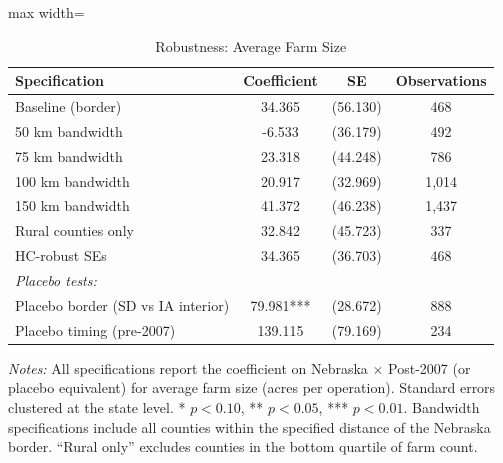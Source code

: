 \begin{table}[H]
\centering
\caption{Robustness: Average Farm Size}
\label{tab:robust}
\begin{threeparttable}
\begin{adjustbox}{max width=\textwidth}
\begin{tabular}{lccc}
\toprule
Specification & Coefficient & SE & Observations \\
\midrule
Baseline (border) & 34.365 & (56.130) & 468 \\
50 km bandwidth & -6.533 & (36.179) & 492 \\
75 km bandwidth & 23.318 & (44.248) & 786 \\
100 km bandwidth & 20.917 & (32.969) & 1,014 \\
150 km bandwidth & 41.372 & (46.238) & 1,437 \\
Rural counties only & 32.842 & (45.723) & 337 \\
HC-robust SEs & 34.365 & (36.703) & 468 \\
\midrule
\multicolumn{4}{l}{\textit{Placebo tests:}} \\
Placebo border (SD vs IA interior) & 79.981*** & (28.672) & 888 \\
Placebo timing (pre-2007) & 139.115 & (79.169) & 234 \\
\bottomrule
\end{tabular}
\end{adjustbox}
\begin{tablenotes}[flushleft]
\small
\item \textit{Notes:} All specifications report the coefficient on Nebraska $\times$ Post-2007 (or placebo equivalent) for average farm size (acres per operation). Standard errors clustered at the state level. * $p<0.10$, ** $p<0.05$, *** $p<0.01$. Bandwidth specifications include all counties within the specified distance of the Nebraska border. ``Rural only'' excludes counties in the bottom quartile of farm count.
\end{tablenotes}
\end{threeparttable}
\end{table}
